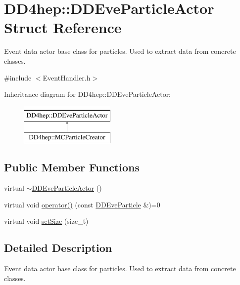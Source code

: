 \hypertarget{struct_d_d4hep_1_1_d_d_eve_particle_actor}{}\section{D\+D4hep\+:\+:D\+D\+Eve\+Particle\+Actor Struct Reference}
\label{struct_d_d4hep_1_1_d_d_eve_particle_actor}


Event data actor base class for particles. Used to extract data from concrete classes.  




{\ttfamily \#include $<$Event\+Handler.\+h$>$}

Inheritance diagram for D\+D4hep\+:\+:D\+D\+Eve\+Particle\+Actor\+:\begin{figure}[H]
\begin{center}
\leavevmode
\includegraphics[height=2.000000cm]{struct_d_d4hep_1_1_d_d_eve_particle_actor}
\end{center}
\end{figure}
\subsection*{Public Member Functions}
\begin{DoxyCompactItemize}
\item 
virtual \hyperlink{struct_d_d4hep_1_1_d_d_eve_particle_actor_a98cc089b4106ef7c3e468ced02532917}{$\sim$\+D\+D\+Eve\+Particle\+Actor} ()
\item 
virtual void \hyperlink{struct_d_d4hep_1_1_d_d_eve_particle_actor_a27707fecbdb50e7566ec01c784fcc669}{operator()} (const \hyperlink{class_d_d4hep_1_1_d_d_eve_particle}{D\+D\+Eve\+Particle} \&)=0
\item 
virtual void \hyperlink{struct_d_d4hep_1_1_d_d_eve_particle_actor_ac272c9587190181a943894d5983b1ac9}{set\+Size} (size\+\_\+t)
\end{DoxyCompactItemize}


\subsection{Detailed Description}
Event data actor base class for particles. Used to extract data from concrete classes. 

